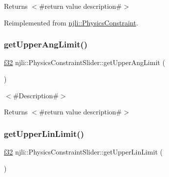 \begin{DoxyReturn}{Returns}
$<$\#return value description\#$>$ 
\end{DoxyReturn}


Reimplemented from \mbox{\hyperlink{classnjli_1_1_physics_constraint_a3234aefaf2706165fbc52b5b37c05888}{njli\+::\+Physics\+Constraint}}.

\mbox{\label{classnjli_1_1_physics_constraint_slider_a9a5f4200038f730b6258fb192747821b}} 
\subsubsection{\texorpdfstring{get\+Upper\+Ang\+Limit()}{getUpperAngLimit()}}
{\footnotesize\ttfamily \mbox{\hyperlink{_util_8h_a5f6906312a689f27d70e9d086649d3fd}{f32}} njli\+::\+Physics\+Constraint\+Slider\+::get\+Upper\+Ang\+Limit (\begin{DoxyParamCaption}{ }\end{DoxyParamCaption})}

$<$\#\+Description\#$>$

\begin{DoxyReturn}{Returns}
$<$\#return value description\#$>$ 
\end{DoxyReturn}
\mbox{\label{classnjli_1_1_physics_constraint_slider_ab3f5c8fdee3a5425050e672ce7cd51d6}} 
\subsubsection{\texorpdfstring{get\+Upper\+Lin\+Limit()}{getUpperLinLimit()}}
{\footnotesize\ttfamily \mbox{\hyperlink{_util_8h_a5f6906312a689f27d70e9d086649d3fd}{f32}} njli\+::\+Physics\+Constraint\+Slider\+::get\+Upper\+Lin\+Limit (\begin{DoxyParamCaption}{ }\end{DoxyParamCaption})}


